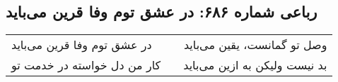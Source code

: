 \begin{center}
\section*{رباعی شماره ۶۸۶: در عشق توم وفا قرین می‌باید}
\label{sec:0686}
\begin{longtable}{l p{0.5cm} r}
در عشق توم وفا قرین می‌باید
&&
وصل تو گمانست، یقین می‌باید
\\
کار من دل خواسته در خدمت تو
&&
بد نیست ولیکن به ازین می‌باید
\\
\end{longtable}
\end{center}
